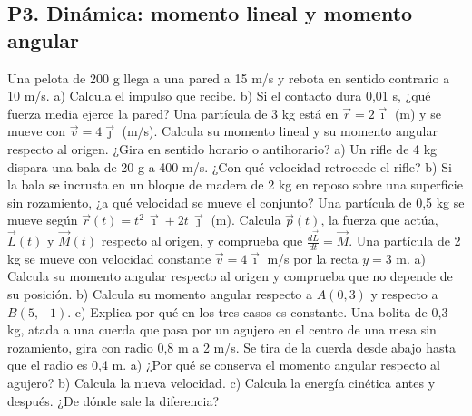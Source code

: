 \documentclass[11pt,a4paper]{article}
\newcommand{\ii}{\vec{\imath}}
\newcommand{\jj}{\vec{\jmath}}
\begin{document}
\subsection*{P3. Dinámica: momento lineal y momento angular}
\begin{enumerate}[leftmargin=1.4cm,itemsep=5pt]
 Una pelota de 200 g llega a una pared a 15 m/s y rebota en sentido contrario a 10 m/s. a) Calcula el impulso que recibe. b) Si el contacto dura 0,01 s, ¿qué fuerza media ejerce la pared?
 Una partícula de 3 kg está en $\vec r=2\ii$ (m) y se mueve con $\vec v=4\jj$ (m/s). Calcula su momento lineal y su momento angular respecto al origen. ¿Gira en sentido horario o antihorario?
 a) Un rifle de 4 kg dispara una bala de 20 g a 400 m/s. ¿Con qué velocidad retrocede el rifle? b) Si la bala se incrusta en un bloque de madera de 2 kg en reposo sobre una superficie sin rozamiento, ¿a qué velocidad se mueve el conjunto?
 Una partícula de 0,5 kg se mueve según $\vec r(t)=t^2\,\ii+2t\,\jj$ (m). Calcula $\vec p(t)$, la fuerza que actúa, $\vec L(t)$ y $\vec M(t)$ respecto al origen, y comprueba que $\frac{d\vec L}{dt}=\vec M$.
 Una partícula de 2 kg se mueve con velocidad constante $\vec v=4\ii$ m/s por la recta $y=3$ m. a) Calcula su momento angular respecto al origen y comprueba que no depende de su posición. b) Calcula su momento angular respecto a $A(0,3)$ y respecto a $B(5,-1)$. c) Explica por qué en los tres casos es constante.
 Una bolita de 0,3 kg, atada a una cuerda que pasa por un agujero en el centro de una mesa sin rozamiento, gira con radio 0,8 m a 2 m/s. Se tira de la cuerda desde abajo hasta que el radio es 0,4 m. a) ¿Por qué se conserva el momento angular respecto al agujero? b) Calcula la nueva velocidad. c) Calcula la energía cinética antes y después. ¿De dónde sale la diferencia?
\end{enumerate}
\end{document}
